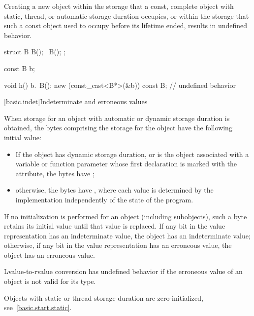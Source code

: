 \pnum
Creating a new object within the storage that a const, complete
object with static, thread, or automatic storage duration occupies,
or within the storage that such a const object used to occupy before
its lifetime ended, results in undefined behavior.
\begin{example}
\begin{codeblock}
struct B {
  B();
  ~B();
};

const B b;

void h() {
  b.~B();
  new (const_cast<B*>(&b)) const B;     // undefined behavior
}
\end{codeblock}
\end{example}

[basic.indet]{Indeterminate and erroneous values}

\pnum
When storage for an object with automatic or dynamic storage duration
is obtained,
the bytes comprising the storage for the object
have the following initial value:
\begin{itemize}
\item
If the object has dynamic storage duration, or
is the object associated with a variable or function parameter
whose first declaration is marked with
the \tcode{[[indeterminate]]} attribute,
the bytes have ;
\item
otherwise, the bytes have ,
where each value is determined by the implementation
independently of the state of the program.
\end{itemize}
If no initialization is performed for an object (including subobjects),
such a byte retains its initial value
until that value is replaced.
If any bit in the value representation has an indeterminate value,
the object has an indeterminate value;
otherwise, if any bit in the value representation has an erroneous value,
the object has an erroneous value.
\begin{note}
Lvalue-to-rvalue conversion has undefined behavior
if the erroneous value of an object is not valid for its type.
\end{note}
\begin{note}
Objects with static or thread storage duration are zero-initialized,
see~\ref{basic.start.static}.
\end{note}

